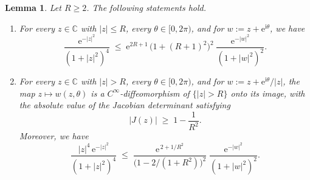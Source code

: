 \documentclass[11pt]{amsart}
\newtheorem{lemma}[theorem]{Lemma}
\theoremstyle{remark}
\newcommand{\C}{\mathbb{C}}
\newcommand{\abs}[1]{\lvert #1 \rvert}
\newcommand{\ee}{\mathrm{e}}
\newcommand{\ii}{\mathrm{i}}
\begin{document}
\begin{lemma}\label{lem:weight-shift}
Let $R \ge 2$. The following statements hold.
\begin{enumerate}[\rm(i)]
\item For every $z \in \C$ with $\abs{z}\le R$, every $\theta \in
[0,2\pi)$, and for $w := z + \ee^{\ii\theta}$, we have
\begin{equation}\label{eq:weight-shift-bd}
\frac{\ee^{-\abs{z}^{2}}}{(1+\abs{z}^{2})^{4}}
\;\le\;
\ee^{2R+1}\,\bigl(1+(R+1)^{2}\bigr)^{2}\;
\frac{\ee^{-\abs{w}^{2}}}{(1+\abs{w}^{2})^{2}}.
\end{equation}
\item For every $z \in \C$ with $\abs{z} > R$, every $\theta \in
[0,2\pi)$, and for $w := z + \ee^{\ii\theta}/\abs{z}$, the map $z \mapsto
w(z,\theta)$ is a $C^{\infty}$-diffeomorphism of $\{\abs{z}>R\}$ onto
its image, with the absolute value of the Jacobian determinant satisfying
\[
\bigl\lvert J(z)\bigr\rvert \;\ge\; 1 - \frac{1}{R^{2}}.
\]
Moreover, we have
\begin{equation}\label{eq:weight-shift-out}
\frac{\abs{z}^{4}\,\ee^{-\abs{z}^{2}}}{(1+\abs{z}^{2})^{4}}
\;\le\;
\frac{\ee^{\,2 + 1/R^{2}}}{\bigl(1-2/(1+R^{2})\bigr)^{2}}\;
\frac{\ee^{-\abs{w}^{2}}}{(1+\abs{w}^{2})^{2}}.
\end{equation}
\end{enumerate}
\end{lemma}
\end{document}
